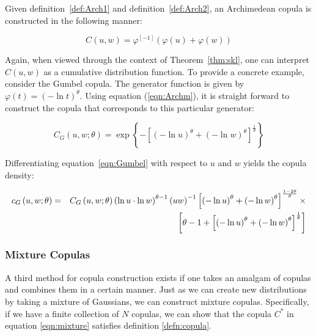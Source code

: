 \documentclass[12pt]{article}
\begin{document}
Given definition~\ref{def:Arch1} and definition~\ref{def:Arch2}, an Archimedean copula is constructed in the following manner:

\begin{equation} \label{eqn:Archm}
	C\left(u,w\right) = \varphi^{\left[-1\right]}\left(\varphi\left(u\right)+\varphi\left(w\right)\right)
\end{equation}

Again, when viewed through the context of Theorem~\ref{thm:skl}, one can interpret $C\left(u,w\right)$ as a cumulative distribution function. To provide a concrete example, consider the Gumbel copula. The generator function is given by $\varphi\left(t\right) = \left(-\ln t\right)^{\theta}$. Using equation (\ref{eqn:Archm}), it is straight forward to construct the copula that corresponds to this particular generator:

\begin{equation} \label{eqn:Gumbel}
	C_{G}\left(u,w;\theta\right) = \exp\left\{-\left[\left(-\ln u\right)^{\theta}+\left( -\ln w\right)^{\theta }\right]^{\frac{1}{\theta}}\right\}
\end{equation}

Differentiating equation~\ref{eqn:Gumbel} with respect to $u$ and $w$ yields the copula density:

\begin{eqnarray}
	c_{G}\left(u,w;\theta\right) &=& C_{G}\left(u,w;\theta\right)\left(\ln u\cdot\ln w\right)^{\theta -1}\left(uw\right)^{-1}\left[\left(-\ln u\right)^{\theta}+\left(-\ln w\right)^{\theta}\right]^{\frac{1-2\theta}{\theta}}\times  \notag \\
	&& \left[\theta -1+\left[\left(-\ln u\right)^{\theta}+\left(-\ln w\right)^{\theta}\right]^{\frac{1}{\theta}}\right]
\end{eqnarray}

\subsubsection{Mixture Copulas} \label{sec:mixtureCopula}

A third method for copula construction exists if one takes an amalgam of copulas and combines them in a certain manner. Just as we can create new distributions by taking a mixture of Gaussians, we can construct mixture copulas. Specifically, if we have a finite collection of $N$ copulas, we can show that the copula $C^{\ast}$ in equation \ref{eqn:mixture} satisfies definition \ref{defn:copula}.
\end{document}
